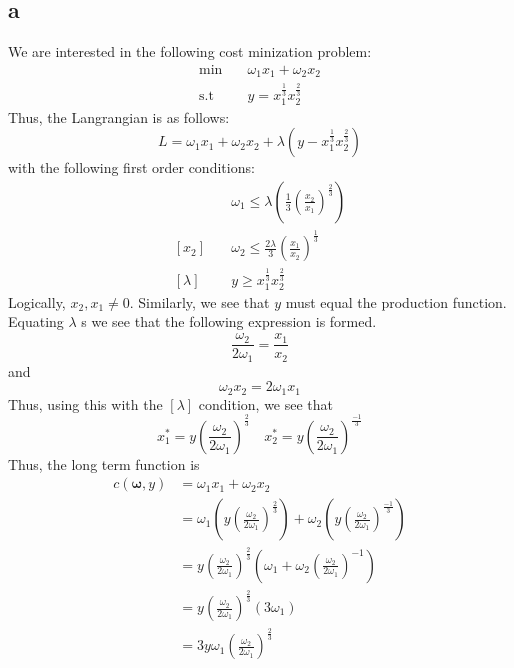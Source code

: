 \documentclass[11pt]{article}
\newcommand{\st}{\text{s.t}}
\begin{document}
\subsection*{a}
We are interested in the following cost minization problem:
\begin{align*}
    \min & \quad \omega_1 x_1 + \omega_2 x_2\\
    \st & \quad y = x_1^{\frac{1}{3}} x_2^{\frac{2}{3}}
\end{align*}
Thus, the Langrangian is as follows:
\[
L = \omega_1x_1 + \omega_2x_2 +\lambda(y -  x_1^{\frac{1}{3}} x_2^{\frac{2}{3}})
\]
with the following first order conditions:
\begin{align*}
    [x_1] & \quad \omega_1 \leq \lambda \left( \frac{1}{3} \left( \frac{x_2}{x_1} \right)^\frac{2}{3} \right)\\
    [x_2] & \quad \omega_2 \leq \frac{2\lambda}{3} \left( \frac{x_1}{x_2} \right)^\frac{1}{3}\\
    [\lambda] & \quad y \geq x_1^\frac{1}{3} x_2^\frac{2}{3}
\end{align*}
Logically, $x_2, x_1 \neq 0$. Similarly, we see that $y$ must equal the production function. Equating $\lambda$ s we see that the following expression is formed. 
\[
\frac{\omega_2}{2 \omega_1} = \frac{x_1}{x_2}
\]
and 
\[
\omega_2 x_2 = 2\omega_1 x_1
\]
Thus, using this with the $[\lambda]$ condition, we see that
\[
x_1^* = y \left( \frac{\omega_2}{2\omega_1} \right)^\frac{2}{3} \quad x_2^* = y \left( \frac{\omega_2}{2\omega_1} \right)^\frac{-1}{3}
\]
Thus, the long term function is 
\begin{align*}
    c(\mathbf{\omega}, y) &= \omega_1 x_1 + \omega_2 x_2\\
    &= \omega_1 \left( y \left( \frac{\omega_2}{2\omega_1} \right)^\frac{2}{3} \right) + \omega_2 \left( y \left( \frac{\omega_2}{2\omega_1} \right)^\frac{-1}{3} \right) \\
    &= y \left( \frac{\omega_2}{2\omega_1} \right)^\frac{2}{3} \left( 
        \omega_1 + \omega_2 \left( \frac{\omega_2}{2\omega_1} \right)^{-1}
     \right)\\
     &= y \left( \frac{\omega_2}{2\omega_1} \right)^\frac{2}{3} (3\omega_1)\\
     &= 3y \omega_1\left( \frac{\omega_2}{2\omega_1} \right)^\frac{2}{3} 
 \end{align*}
\end{document}
